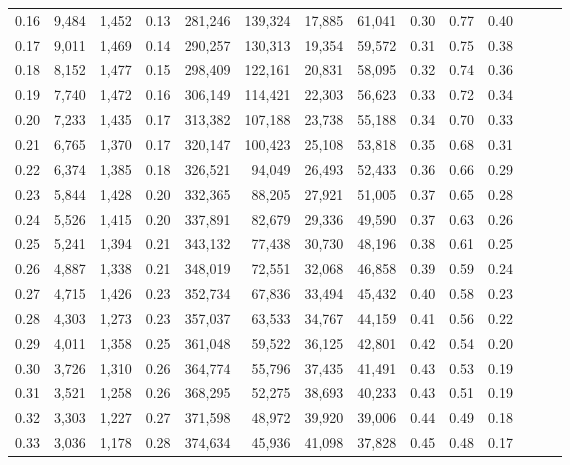 \begin{tabular}{rrrrrrrrrrrrrr}
0.16 &   9,484 &  1,452 &  0.13 &  281,246 &  139,324 &  17,885 &  61,041 &  0.30 &  0.77 &      0.40 \\
0.17 &   9,011 &  1,469 &  0.14 &  290,257 &  130,313 &  19,354 &  59,572 &  0.31 &  0.75 &      0.38 \\
0.18 &   8,152 &  1,477 &  0.15 &  298,409 &  122,161 &  20,831 &  58,095 &  0.32 &  0.74 &      0.36 \\
0.19 &   7,740 &  1,472 &  0.16 &  306,149 &  114,421 &  22,303 &  56,623 &  0.33 &  0.72 &      0.34 \\
0.20 &   7,233 &  1,435 &  0.17 &  313,382 &  107,188 &  23,738 &  55,188 &  0.34 &  0.70 &      0.33 \\
0.21 &   6,765 &  1,370 &  0.17 &  320,147 &  100,423 &  25,108 &  53,818 &  0.35 &  0.68 &      0.31 \\
0.22 &   6,374 &  1,385 &  0.18 &  326,521 &   94,049 &  26,493 &  52,433 &  0.36 &  0.66 &      0.29 \\
0.23 &   5,844 &  1,428 &  0.20 &  332,365 &   88,205 &  27,921 &  51,005 &  0.37 &  0.65 &      0.28 \\
0.24 &   5,526 &  1,415 &  0.20 &  337,891 &   82,679 &  29,336 &  49,590 &  0.37 &  0.63 &      0.26 \\
0.25 &   5,241 &  1,394 &  0.21 &  343,132 &   77,438 &  30,730 &  48,196 &  0.38 &  0.61 &      0.25 \\
0.26 &   4,887 &  1,338 &  0.21 &  348,019 &   72,551 &  32,068 &  46,858 &  0.39 &  0.59 &      0.24 \\
0.27 &   4,715 &  1,426 &  0.23 &  352,734 &   67,836 &  33,494 &  45,432 &  0.40 &  0.58 &      0.23 \\
0.28 &   4,303 &  1,273 &  0.23 &  357,037 &   63,533 &  34,767 &  44,159 &  0.41 &  0.56 &      0.22 \\
0.29 &   4,011 &  1,358 &  0.25 &  361,048 &   59,522 &  36,125 &  42,801 &  0.42 &  0.54 &      0.20 \\
0.30 &   3,726 &  1,310 &  0.26 &  364,774 &   55,796 &  37,435 &  41,491 &  0.43 &  0.53 &      0.19 \\
0.31 &   3,521 &  1,258 &  0.26 &  368,295 &   52,275 &  38,693 &  40,233 &  0.43 &  0.51 &      0.19 \\
0.32 &   3,303 &  1,227 &  0.27 &  371,598 &   48,972 &  39,920 &  39,006 &  0.44 &  0.49 &      0.18 \\
0.33 &   3,036 &  1,178 &  0.28 &  374,634 &   45,936 &  41,098 &  37,828 &  0.45 &  0.48 &      0.17 \\

\end{tabular}
